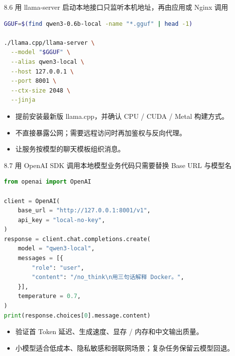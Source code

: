 \begin{frame}[fragile]{8.6 用 llama-server 启动本地接口}{只监听本机地址，再由应用或 Nginx 调用}
  \begin{lstlisting}[language=bash]
GGUF=$(find qwen3-0.6b-local -name "*.gguf" | head -1)

./llama.cpp/llama-server \
  --model "$GGUF" \
  --alias qwen3-local \
  --host 127.0.0.1 \
  --port 8001 \
  --ctx-size 2048 \
  --jinja
  \end{lstlisting}
  \begin{itemize}
    \item 提前安装最新版 llama.cpp，并确认 CPU / CUDA / Metal 构建方式。
    \item {} 不直接暴露公网；需要远程访问时再加鉴权与反向代理。
    \item {} 让服务按模型的聊天模板组织消息。
  \end{itemize}
\end{frame}

\begin{frame}[fragile]{8.7 用 OpenAI SDK 调用本地模型}{业务代码只需要替换 Base URL 与模型名}
  \begin{lstlisting}[language=Python,basicstyle=\ttfamily\fontsize{5.0}{5.7}\selectfont]
from openai import OpenAI

client = OpenAI(
    base_url = "http://127.0.0.1:8001/v1",
    api_key = "local-no-key",
)
response = client.chat.completions.create(
    model = "qwen3-local",
    messages = [{
        "role": "user",
        "content": "/no_think\n用三句话解释 Docker。",
    }],
    temperature = 0.7,
)
print(response.choices[0].message.content)
  \end{lstlisting}
  \begin{itemize}
    \item 验证首 Token 延迟、生成速度、显存 / 内存和中文输出质量。
    \item 小模型适合低成本、隐私敏感和弱联网场景；复杂任务保留云模型回退。
  \end{itemize}
\end{frame}
